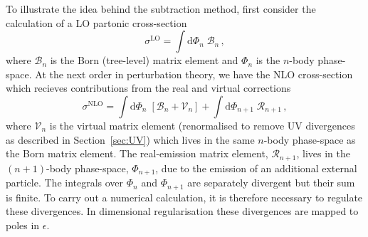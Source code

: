 \documentclass[main.tex]{subfiles}
\begin{document}
    To illustrate the idea behind the subtraction method,
    first consider the calculation of a LO partonic cross-section
    \begin{equation}\label{eqn:LO_cs}
        \sigma^{\mathrm{LO}} = \int \mathrm{d}\Phi_{n} \; \mathcal{B}_{n} \, ,
    \end{equation}
    where $\mathcal{B}_{n}$ is the Born (tree-level) matrix
    element and $\Phi_{n}$ is the $n$-body phase-space.
    At the next order in perturbation theory, we have the NLO
    cross-section which recieves contributions from the real and virtual
    corrections
    \begin{equation}\label{eqn:NLO_cs}
        \sigma^{\mathrm{NLO}} = \int \mathrm{d}\Phi_{n} \; \left[\mathcal{B}_{n} + \mathcal{V}_{n}\right] + \int \mathrm{d}\Phi_{n+1} \; \mathcal{R}_{n+1} \, ,
    \end{equation}
    where $\mathcal{V}_{n}$ is the virtual matrix element (renormalised
    to remove UV divergences as described in Section~\ref{sec:UV})
    which lives in the same $n$-body phase-space as the Born
    matrix element. The real-emission matrix element, $\mathcal{R}_{n+1}$,
    lives in the $(n+1)$-body phase-space, $\Phi_{n+1}$, due to the emission
    of an additional external particle. The integrals over $\Phi_{n}$ and
    $\Phi_{n+1}$ are separately divergent but their sum is finite. To
    carry out a numerical calculation, it is therefore necessary
    to regulate these divergences. In dimensional regularisation these
    divergences are mapped to poles in $\epsilon$.
\end{document}
